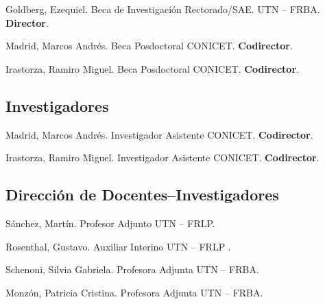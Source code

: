      Goldberg, Ezequiel. Beca de Investigación Rectorado/SAE. UTN -- FRBA. \textbf{Director}.

     Madrid, Marcos Andrés. Beca Posdoctoral CONICET. \textbf{Codirector}.

     Irastorza, Ramiro Miguel. Beca Posdoctoral CONICET. \textbf{Codirector}.

\subsection{Investigadores}
     Madrid, Marcos Andrés. Investigador Asistente CONICET. \textbf{Codirector}.

     Irastorza, Ramiro Miguel. Investigador Asistente CONICET. \textbf{Codirector}.
  
\subsection{Dirección de Docentes--Investigadores}
   Sánchez, Martín. Profesor Adjunto UTN -- FRLP.
  
   Rosenthal, Gustavo. Auxiliar Interino UTN -- FRLP .
  
   Schenoni, Silvia Gabriela. Profesora Adjunta UTN -- FRBA.
  
   Monzón, Patricia Cristina. Profesora Adjunta UTN -- FRBA.
  

